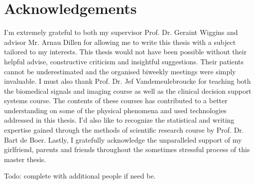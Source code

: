 
\chapter{Acknowledgements}
\label{ch:acknowledgements}

I'm extremely grateful to both my supervisor Prof. Dr. Geraint Wiggins and advisor Mr. Arnau Dillen for allowing me to write this thesis with a subject tailored to my interests.
This thesis would not have been possible without their helpful advise, constructive criticism and insightful suggestions.
Their patients cannot be underestimated and the organised biweekly meetings were simply invaluable.
I must also thank Prof. Dr. Jef Vandemeulebroucke for teaching both the biomedical signals and imaging course as well as the clinical decision support systems course.
The contents of these courses has contributed to a better understanding on some of the physical phenomena and used technologies addressed in this thesis.
I’d also like to recognize the statistical and writing expertise gained through the methods of scientific research course by Prof. Dr. Bart de Boer.
Lastly, I gratefully acknowledge the unparalleled support of my girlfriend, parents and friends throughout the sometimes stressful process of this master thesis.

Todo: complete with additional people if need be.